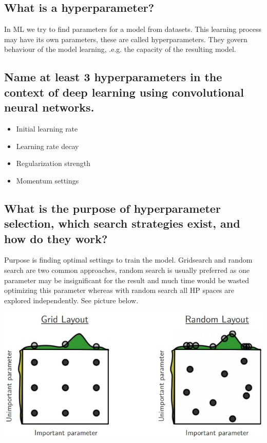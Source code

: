 \subsection{What is a hyperparameter?}
In ML we try to find parameters for a model from datasets. This learning process may have its own parameters, these are called hyperparameters. They govern behaviour of the model learning, .e.g. the capacity of the resulting model.
\subsection{Name at least 3 hyperparameters in the context of deep learning using convolutional neural networks.}
\begin{multicols}{2}
\begin{itemize}
\item Initial learning rate
\item Learning rate decay
\item Regularization strength
\item Momentum settings
\end{itemize}
\end{multicols}
\subsection{What is the purpose of hyperparameter selection, which search strategies exist, and how do they work?}
\begin{minipage}{0.5\textwidth}
Purpose is finding optimal settings to train the model. Gridsearch and random search are two common approaches, random search is usually preferred as one parameter may be insignificant for the result and much time would be wasted optimizing this parameter whereas with random search all HP spaces are explored independently. See picture below.
\end{minipage}
\begin{minipage}{0.5\textwidth}
\includegraphics[width=\textwidth]{./img/gridsearchbad.jpeg}
\end{minipage}


